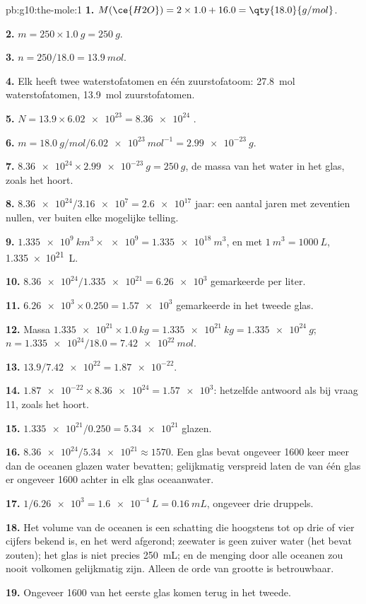 \begin{solution}{pb:g10:the-mole:1}
\textbf{1.} $M(\ce{H2O}) = 2 \times 1.0 + 16.0 = \qty{18.0}{g/mol}$.

\textbf{2.} $m = 250 \times \qty{1.0}{g} = \qty{250}{g}$.

\textbf{3.} $n = 250 / 18.0 = \qty{13.9}{mol}$.

\textbf{4.} Elk  heeft twee waterstofatomen en één zuurstofatoom:
\qty{27.8}{mol} waterstofatomen, \qty{13.9}{mol} zuurstofatomen.

\textbf{5.} $N = 13.9 \times \num{6.02e23} = \num{8.36e24}$ .

\textbf{6.} $m = \qty{18.0}{g/mol} / \qty{6.02e23}{mol^{-1}} =
\qty{2.99e-23}{g}$.

\textbf{7.} $\num{8.36e24} \times \qty{2.99e-23}{g} = \qty{250}{g}$, de
massa van het water in het glas, zoals het hoort.

\textbf{8.} $\num{8.36e24} / \num{3.16e7} = \num{2.6e17}$ jaar: een aantal
jaren met zeventien nullen, ver buiten elke mogelijke telling.

\textbf{9.} $\qty{1.335e9}{km^3} \times \num{e9} = \qty{1.335e18}{m^3}$,
en met $\qty{1}{m^3} = \qty{1000}{L}$, \qty{1.335e21}{L}.

\textbf{10.} $\num{8.36e24} / \num{1.335e21} = \num{6.26e3}$ gemarkeerde
 per liter.

\textbf{11.} $\num{6.26e3} \times 0.250 = \num{1.57e3}$ gemarkeerde
 in het tweede glas.

\textbf{12.} Massa $\num{1.335e21} \times \qty{1.0}{kg} =
\qty{1.335e21}{kg} = \qty{1.335e24}{g}$; $n = \num{1.335e24} / 18.0 =
\qty{7.42e22}{mol}$.

\textbf{13.} $13.9 / \num{7.42e22} = \num{1.87e-22}$.

\textbf{14.} $\num{1.87e-22} \times \num{8.36e24} = \num{1.57e3}$:
hetzelfde antwoord als bij vraag 11, zoals het hoort.

\textbf{15.} $\num{1.335e21} / 0.250 = \num{5.34e21}$ glazen.

\textbf{16.} $\num{8.36e24} / \num{5.34e21} \approx 1570$. Een glas bevat
ongeveer 1600 keer meer  dan de oceanen glazen water bevatten;
gelijkmatig verspreid laten de  van één glas er ongeveer 1600
achter in elk glas oceaanwater.

\textbf{17.} $1 / \num{6.26e3} = \qty{1.6e-4}{L} = \qty{0.16}{mL}$,
ongeveer drie druppels.

\textbf{18.} Het volume van de oceanen is een schatting die hoogstens tot
op drie of vier cijfers bekend is, en het werd afgerond; zeewater is geen
zuiver water (het bevat zouten); het glas is niet precies \qty{250}{mL};
en de menging door alle oceanen zou nooit volkomen gelijkmatig zijn.
Alleen de orde van grootte is betrouwbaar.

\textbf{19.} Ongeveer 1600  van het eerste glas komen terug in
het tweede.
\end{solution}
